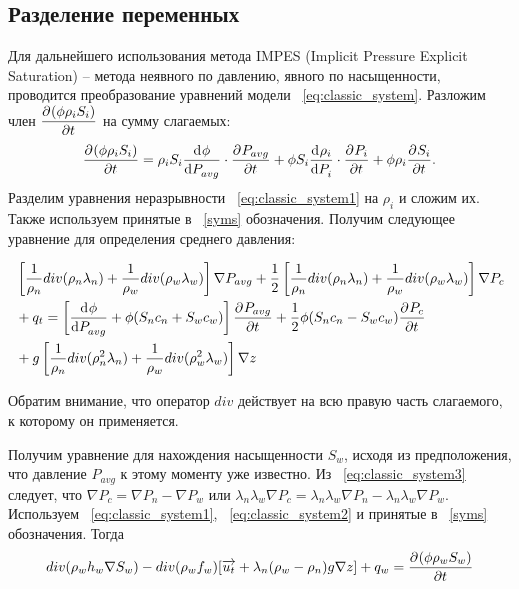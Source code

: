 \subsection{Разделение переменных}
\label{var_division}
Для дальнейшего использования метода IMPES (Implicit Pressure Explicit Saturation) -- метода неявного по давлению,
явного по насыщенности, проводится преобразование уравнений модели ~\eqref{eq:classic_system}.
Разложим член $\dfrac{\partial^{} (\phi \rho_i S_i)}{\partial t^{}}$ на сумму слагаемых:
\begin{equation}
 \dfrac{\partial^{} (\phi \rho_i S_i)}{\partial t^{}} = \rho_i S_i \dfrac{\mathrm d^{} \phi}{\mathrm d P_{avg}^{}} \cdot \dfrac{\partial^{} P_{avg}}{\partial t^{}}
 + \phi S_i \dfrac{\mathrm d^{} \rho_i}{\mathrm d P_i^{}} \cdot \dfrac{\partial^{} P_i}{\partial t^{}} + \phi \rho_i \dfrac{\partial^{} S_i}{\partial t^{}}.
\end{equation}
Разделим уравнения неразрывности ~\eqref{eq:classic_system1} на $\rho_i$ 
и сложим их. Также используем принятые в ~\ref{syms} обозначения.
Получим следующее уравнение для определения среднего давления:

\begin{equation} \label{eq:classic_pressure}
 \begin{aligned}
  &\left[ \frac{1}{\rho_n} div (\rho_n\lambda_n) + \frac{1}{\rho_w} div (\rho_w\lambda_w) \right] \nabla P_{avg} + 
  \frac{1}{2} \left[ \frac{1}{\rho_n} div (\rho_n\lambda_n) + \frac{1}{\rho_w} div (\rho_w\lambda_w) \right] \nabla P_c \\
  & + q_t = \left[ \dfrac{\mathrm d^{} \phi}{\mathrm d P_{avg}^{}} + \phi (S_n c_n + S_w c_w) \right] \dfrac{\partial^{} P_{avg}}{\partial t^{}} +
  \frac{1}{2} \phi (S_n c_n - S_w c_w) \dfrac{\partial^{} P_{c}}{\partial t^{}} \\
  & + g \left[ \frac{1}{\rho_n} div (\rho_n^2\lambda_n) + \frac{1}{\rho_w} div (\rho_w^2\lambda_w) \right] \nabla z
 \end{aligned}
\end{equation}

Обратим внимание, что оператор $div$ действует на всю правую часть слагаемого, к которому он применяется.

Получим уравнение для нахождения насыщенности $S_w$, исходя из предположения,
что давление $P_{avg}$ к этому моменту уже известно.
Из ~\eqref{eq:classic_system3} следует, что $\nabla P_c = \nabla P_n - \nabla P_w$ или
$\lambda_n\lambda_w\nabla P_c = \lambda_n\lambda_w\nabla P_n - \lambda_n\lambda_w\nabla P_w$.
Используем ~\eqref{eq:classic_system1}, ~\eqref{eq:classic_system2} и принятые в ~\ref{syms} обозначения.
Тогда
\begin{equation} \label{eq:classic_saturation}
  div(\rho_w h_w \nabla S_w) - div(\rho_w f_w)[\overrightarrow{u_t} + \lambda_n(\rho_w - \rho_n)g \nabla z] + q_w 
  = \dfrac{\partial^{} (\phi \rho_w S_w)}{\partial t^{}}
\end{equation} 
 
